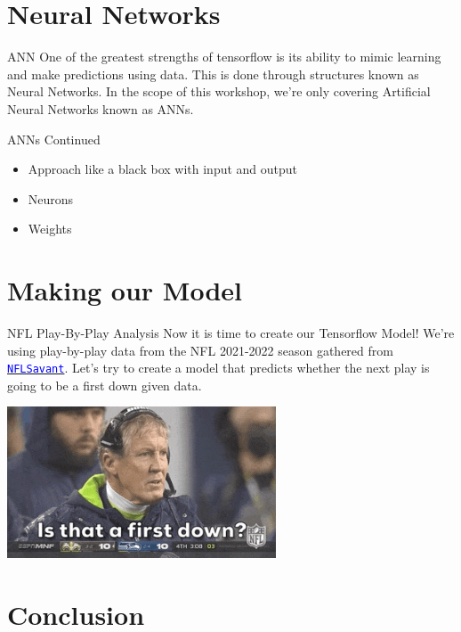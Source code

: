 \documentclass{beamer}
\begin{document}
\section{Neural Networks}

\begin{frame}[fragile]{ANN}
One of the greatest strengths of tensorflow is its ability to mimic learning and make predictions using data. This is done through structures known as Neural Networks. In the scope of this workshop, we're only covering Artificial Neural Networks known as ANNs.
\end{frame}

\begin{frame}[fragile]{ANNs Continued}
\begin{itemize}
	\item Approach like a black box with input and output
	\item Neurons
	\item Weights
\end{itemize}
\end{frame}


\section{Making our Model}

\begin{frame}[fragile]{NFL Play-By-Play Analysis}
Now it is time to create our Tensorflow Model! We're using play-by-play data from the NFL 2021-2022 season gathered from \href{http://nflsavant.com/about.php}{\tt \textcolor{blue}{NFLSavant}}. Let's try to create a model that predicts whether the next play is going to be a first down given data. 
\begin{center}
{\includegraphics[width=8cm]{images/pete.jpg}}
\end{center}
\end{frame}


\section{Conclusion}
\end{document}
